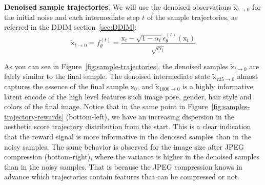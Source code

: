 \noindent \noindent \textbf{Denoised sample trajectories.} We will use the denoised observations $\tilde{\mathrm{x}}_{t\rightarrow 0}$ for the initial
noise and each intermediate step $t$ of the sample trajectories, as referred in the DDIM section~\ref{sec:DDIM}:
\begin{equation}\label{eqn:ddim-predicted-sample}
  \tilde{\mathrm{x}}_{t\rightarrow0}=f_{\theta}^{(t)}=\frac{\mathrm{x}_{t}-\sqrt{1-\alpha_{t}}\epsilon_{\theta}^{(t)}(\mathrm{x}_{t})}{\sqrt{\alpha_{t}}}
\end{equation}

\noindent As you can see in Figure~\ref{fig:sample-trajectories}, the denoised samples $\tilde{\mathrm{x}}_{t\rightarrow0}$ are fairly similar to the
final sample. The denoised intermediate state $\tilde{\mathrm{x}}_{725\rightarrow0}$ almost captures the essence of the final sample $\mathrm{x}_{0}$, and $\tilde{\mathrm{x}}_{1000\rightarrow0}$ is a highly informative latent encode of the high level features such image pose, gender, hair style and colors of the final image. Notice that in the same point in Figure~\ref{fig:samples-trajectory-rewards} (bottom-left), we have an increasing dispersion in the aesthetic score trajectory distribution from the start. This is a clear indication that the reward signal is more informative in the denoised samples than in the noisy samples. The same behavior is observed for the image size after JPEG compression (bottom-right), where the variance is higher in the denoised samples than in the noisy samples. That is because the
JPEG compression knows in advance which trajectories contain features that can be compressed or not.

